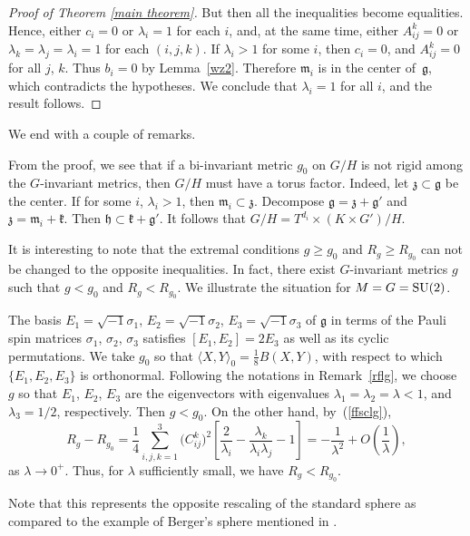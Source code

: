 \documentclass[pdftex]{sigma}
\begin{document}
\begin{proof}[Proof of Theorem \ref{main theorem}]
But then all the inequalities become equalities. Hence, either $c_i=0$ or $\lambda_i=1$ for each $i$, and, at the same time, either $A^k_{ij}=0$ or $\lambda_{k}= \lambda_{j}= \lambda_{i}=1$ for each $(i,j,k)$.
If $\lambda_i>1$ for some $i$, then $c_i=0$, and $A^k_{ij}=0$ for all $j$, $k$. Thus $b_i=0$ by Lemma~\ref{wz2}. Therefore $\mathfrak{m}_i$ is in the center of~$\mathfrak{g}$, which contradicts the hypotheses. We conclude that $\lambda_i=1$ for all $i$, and the result follows.
\end{proof}

We end with a couple of remarks.

\begin{Remark}
From the proof, we see that if a bi-invariant metric $g_0$	 on $G/H$ is not rigid among the $G$-invariant metrics, then $G/H$ must have a torus factor. Indeed, let $\mathfrak{z} \subset \mathfrak{g}$ be the center. If for some $i$, $\lambda_i>1$, then $\mathfrak{m}_i \subset \mathfrak{z}$. Decompose $\mathfrak{g}=\mathfrak{z} + \mathfrak{g'}$ and $\mathfrak{z}=\mathfrak{m}_i + \mathfrak{k}$. Then $\mathfrak{h} \subset \mathfrak{k} +\mathfrak{g'} $. It follows that $G/H=T^{d_i} \times (K\times G')/H$.
	\end{Remark}

\begin{Remark}
It is interesting to note that the extremal conditions $g\geq g_0$ and $R_g\geq R_{g_0}$ can not be changed to the opposite inequalities. In fact, there exist $G$-invariant metrics $g$ such that $g< g_0$ and $R_g< R_{g_0}$. We illustrate the situation for $M=G={\rm SU}(2)$.

The basis $E_1=\sqrt{-1}\sigma_1$, $E_2=\sqrt{-1}\sigma_2$, $E_3=\sqrt{-1}\sigma_3$ of $\mathfrak{g}$ in terms of the Pauli spin matrices $\sigma_1$, $\sigma_2$, $\sigma_3$ satisfies
$[E_1, E_2]=2E_3$ as well as its cyclic permutations. We take $g_0$ so that $\langle X, Y \rangle_0=\frac{1}{8}B(X, Y)$, with respect to which $\{ E_1, E_2, E_3 \}$ is orthonormal.
Following the notations in Remark~\ref{rflg}, we choose $g$ so that $E_1$, $E_2$, $E_3$ are the eigenvectors with eigenvalues $\lambda_1=\lambda_2=\lambda <1$, and $\lambda_3=1/2$, respectively. Then $g<g_0$. On the other hand, by~(\ref{ffsclg}),
\[
R_g-R_{g_0}= \frac{1}{4} \sum_{i, j, k=1}^3 \big(C^k_{ij}\big)^2
\left[ \frac{2}{\lambda_i}- \frac{\lambda_{k}}{\lambda_i\lambda_{j}} -1 \right]= -\frac{1}{\lambda^2} + O\left(\frac{1}{\lambda}\right),
\]
as $\lambda \rightarrow 0^{+}$. Thus, for $\lambda$ sufficiently small, we have $R_g< R_{g_0}$.

Note that this represents the opposite rescaling of the standard sphere as compared to the example of Berger's sphere mentioned in \cite[p.~34]{14}.
\end{Remark}
\end{document}
